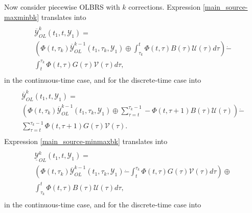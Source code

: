 \documentclass[letterpaper,10pt,english]{sphinxmanual}
\begin{document}
Now consider piecewise OLBRS with $k$ corrections. Expression
\eqref{main_source-maxminbk} translates into
\label{main_source:equation-ctlsmaxminbk}\begin{gather}
\begin{split}\begin{array}{l}
\overline{{\mathcal Y}}_{OL}^k(t_1, t, {\mathcal Y}_1) = \\
\left(\Phi(t, \tau_k)\overline{{\mathcal Y}}_{OL}^{k-1}(t_1, \tau_k, {\mathcal Y}_1) \oplus
\int_{\tau_k}^t\Phi(t, \tau)B(\tau){\mathcal U}(\tau)d\tau\right) \dot{-} \\
\int^{\tau_k}_t\Phi(t, \tau)G(\tau){\mathcal V}(\tau)d\tau,
\end{array}\end{split}\label{main_source-ctlsmaxminbk}
\end{gather}
in the continuous-time case, and for the discrete-time case into
\label{main_source:equation-dtlsmaxminbk}\begin{gather}
\begin{split}\begin{array}{l}
\overline{{\mathcal Y}}_{OL}^k(t_1, t, {\mathcal Y}_1) = \\
\left(\Phi(t, \tau_k)\overline{{\mathcal Y}}_{OL}^{k-1}(t_1, \tau_k, {\mathcal Y}_1) \oplus
\sum_{\tau=t}^{\tau_k-1}-\Phi(t, \tau+1)B(\tau){\mathcal U}(\tau)\right) \dot{-} \\
\sum_{\tau=t}^{\tau_k-1}\Phi(t, \tau+1)G(\tau){\mathcal V}(\tau).
\end{array}\end{split}\label{main_source-dtlsmaxminbk}
\end{gather}
Expression \eqref{main_source-minmaxbk} translates into
\label{main_source:equation-ctlsminmaxbk}\begin{gather}
\begin{split}\begin{array}{l}
\underline{{\mathcal Y}}_{OL}^k(t_1, t, {\mathcal Y}_1) = \\
\left(\Phi(t, \tau_k)\overline{{\mathcal Y}}_{OL}^{k-1}(t_1, \tau_k, {\mathcal Y}_1) \dot{-}
\int^{\tau_k}_t\Phi(t, \tau)G(\tau){\mathcal V}(\tau)d\tau\right)
\oplus \\
\int_{\tau_k}^t\Phi(t, \tau)B(\tau){\mathcal U}(\tau)d\tau,
\end{array}\end{split}\label{main_source-ctlsminmaxbk}
\end{gather}
in the continuous-time case, and for the discrete-time case into
\end{document}

